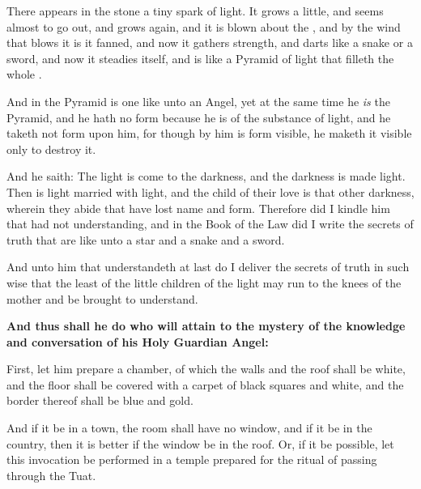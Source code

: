 \index{\AEthyr{}|(}\label{viii}


There appears in the stone a tiny spark of light. It grows a little, and seems almost to go out, and grows again, and it is blown about the \AEthyr, and by the wind that blows it is it fanned, and now it gathers strength, and darts like a snake or a sword, and now it steadies itself, and is like a Pyramid of light that filleth the whole \AEthyr.

And in the Pyramid is one like unto an Angel, yet at the same time he \textit{is} the Pyramid, and he hath no form because he is of the substance of light, and he taketh not form upon him, for though by him is form visible, he maketh it visible only to destroy it.

And he saith: The light is come to the darkness, and the darkness is made light. Then is light married with light, and the child of their love is that other darkness, wherein they abide that have lost name and form. Therefore did I kindle him that had not understanding, and in the Book of the Law did I write the secrets of truth that are like unto a star and a snake and a sword.

And unto him that understandeth at last do I deliver the secrets of truth in such wise that the least of the little children of the light may run to the knees of the mother and be brought to understand.


\textbf{And thus shall he do who will attain to the mystery of the knowledge and conversation of his Holy Guardian Angel:}


First, let him prepare a chamber, of which the walls and the roof shall be white, and the floor shall be covered with a carpet of black squares and white, and the border thereof shall be blue and gold.

And if it be in a town, the room shall have no window, and if it be in the country, then it is better if the window be in the roof. Or, if it be possible, let this invocation be performed in a temple prepared for the ritual of passing through the Tuat.

